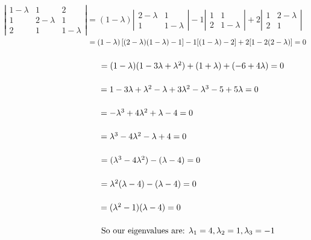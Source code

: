 \documentclass[12pt]{article}
\begin{document}
$\left| \begin{array}{ccc} 1-\lambda & 1 & 2\\ 1 & 2-\lambda & 1 \\ 2 & 1 & 1-\lambda\end{array}\right|
= (1-\lambda)\left| \begin{array}{cc} 2-\lambda & 1\\ 1 & 1-\lambda\end{array}\right| - 1\left| \begin{array}{cc} 1 & 1 \\ 2 & 1-\lambda\end{array}\right| +2\left| \begin{array}{cc} 1 & 2-\lambda\\ 2 & 1\end{array}\right|$ \\
$\hspace*{115pt} = (1-\lambda)\left[(2-\lambda)(1-\lambda) - 1\right] - 1[(1-\lambda) - 2] + 2[1-2(2-\lambda)]=0$ \\\\
$\hspace*{115pt} = (1-\lambda)(1-3\lambda + \lambda^2) + (1+\lambda) + (-6+4\lambda)=0$ \\\\
$\hspace*{115pt} = 1 - 3\lambda + \lambda^2 - \lambda + 3\lambda^2 -\lambda^3 -5 + 5\lambda = 0$ \\\\
$\hspace*{115pt} = -\lambda^3 + 4\lambda^2 + \lambda - 4 = 0$ \\\\
$\hspace*{115pt} = \lambda^3 - 4\lambda^2 - \lambda + 4 = 0$ \\\\
$\hspace*{115pt} = (\lambda^3 - 4\lambda^2) - (\lambda - 4) = 0$ \\\\
$\hspace*{115pt} = \lambda^2(\lambda - 4) - (\lambda - 4) = 0$ \\\\
$\hspace*{115pt} = (\lambda^2 - 1)(\lambda - 4) = 0$ \\\\
$\hspace*{115pt} \text{So our eigenvalues are: } \lambda_1 = 4, \lambda_2 = 1, \lambda_3 = -1$\\
\end{document}
